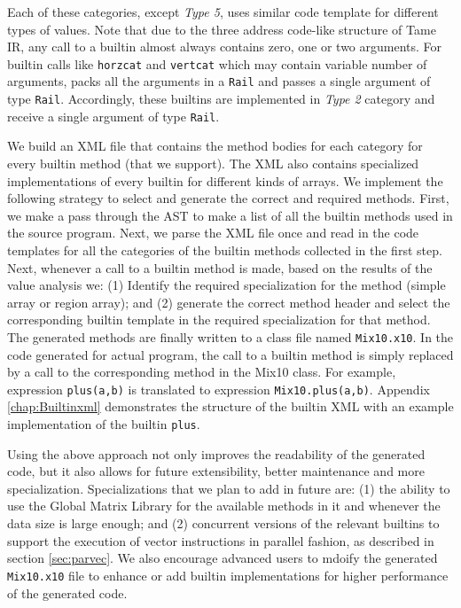 Each of these categories, except \emph{Type 5}, uses similar code template for
different types of values. Note that due to the three address code-like
structure of Tame IR, any call to a builtin almost always contains zero, one or
two arguments. For builtin calls like \texttt{horzcat} and \texttt{vertcat}
which may contain variable number of arguments, \mixten packs all the arguments
in a \texttt{Rail} and passes a single argument of type \texttt{Rail}.
Accordingly, these builtins are implemented in \emph{Type 2} category and receive a
single argument of type \texttt{Rail}.

We build an XML file that contains the method bodies for each category for
every builtin method (that we support). The XML also contains specialized
implementations of every builtin for different kinds of arrays.  We implement
the following strategy to select and generate the correct and required methods.
First, we make a pass through the AST to make a list of all the builtin methods
used in the source \matlab program. Next, we parse the XML file once and read
in the \xten code templates for all the categories of the builtin methods
collected in the first step. Next, whenever a call to a builtin method is made,
based on the results of the value analysis we: (1) Identify the required
specialization for the method (simple array or region array); and (2) generate
the correct method header and select the corresponding builtin template in the
required specialization for that method.  The generated methods are finally
written to a \xten class file named \verb|Mix10.x10|. In the code generated for
actual \matlab program, the call to a builtin method is simply replaced by a
call to the corresponding method in the Mix10 class. For example, \matlab
expression \verb|plus(a,b)| is translated to \xten expression
\verb|Mix10.plus(a,b)|. Appendix \ref{chap:Builtinxml} demonstrates the
structure of the builtin XML with an example implementation of the builtin
\texttt{plus}. 

Using the above approach not only improves the readability of the generated
code, but it also allows for future extensibility, better maintenance and more
specialization. Specializations that we plan to add in future are: (1) the
ability to use the Global Matrix Library for the available methods in it and
whenever the data size is large enough; and (2) concurrent versions of the
relevant builtins to support the execution of vector instructions in parallel
fashion, as
described in section \ref{sec:parvec}. We also encourage advanced users to
mdoify the generated \texttt{Mix10.x10} file to enhance or add builtin
implementations for higher performance of the generated code. 

